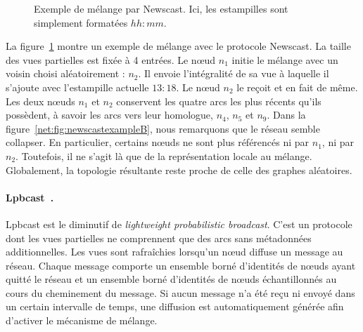 \begin{figure}
  \centering
  \hspace{35pt}
  \caption[Exemple de mélange dans Newscast]
  {\label{net:fig:newscastexample} Exemple de mélange par Newscast. Ici, les
    estampilles sont simplement formatées $hh:mm$.}
\end{figure}

\noindent La figure~\ref{net:fig:newscastexample} montre un exemple de mélange
avec le protocole Newscast. La taille des vues partielles est fixée à 4
entrées. Le nœud $n_1$ initie le mélange avec un voisin choisi aléatoirement :
$n_2$. Il envoie l'intégralité de sa vue à laquelle il s'ajoute avec
l'estampille actuelle $13:18$. Le nœud $n_2$ le reçoit et en fait de même. Les
deux nœuds $n_1$ et $n_2$ conservent les quatre arcs les plus récents qu'ils
possèdent, à savoir les arcs vers leur homologue, $n_4$, $n_5$ et $n_9$. Dans la
figure~\ref{net:fig:newscastexampleB}, nous remarquons que le réseau semble
collapser. En particulier, certains nœuds ne sont plus référencés ni par $n_1$,
ni par $n_2$. Toutefois, il ne s'agit là que de la représentation locale au
mélange. Globalement, la topologie résultante reste proche de celle des graphes
aléatoires.

\paragraph{Lpbcast~\cite{eugster2003lightweight}.} Lpbcast est le diminutif de
\emph{lightweight probabilistic broadcast}. C'est un protocole dont les vues
partielles ne comprennent que des arcs sans métadonnées additionnelles.  Les
vues sont rafraîchies lorsqu'un nœud diffuse un message au réseau. Chaque
message comporte un ensemble borné d'identités de nœuds ayant quitté le réseau
et un ensemble borné d'identités de nœuds échantillonnés au cours du cheminement
du message. Si aucun message n'a été reçu ni envoyé dans un certain intervalle
de temps, une diffusion est automatiquement générée afin d'activer le mécanisme
de mélange.

